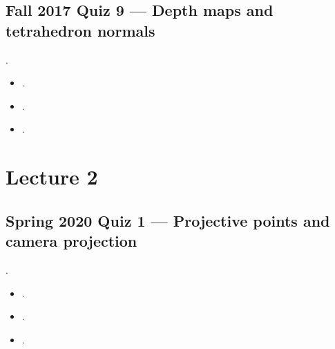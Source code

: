 \documentclass[letterpaper,11pt,english,openany,oneside]{jupyterBook}
\begin{document}
\subsection{Fall 2017 Quiz 9 — Depth maps and tetrahedron normals}
\label{\detokenize{reference/quiz-index:fall-2017-quiz-9-depth-maps-and-tetrahedron-normals}}
\sphinxAtStartPar
{} .
\begin{itemize}
\item {}
\sphinxAtStartPar
{\hyperref[\detokenize{lectures/lecture01/quiz-workbook:quiz-18-q1}]{}}.

\item {}
\sphinxAtStartPar
{\hyperref[\detokenize{lectures/lecture01/quiz-workbook:quiz-18-q2}]{}}.

\item {}
\sphinxAtStartPar
{\hyperref[\detokenize{lectures/lecture01/quiz-workbook:quiz-18-q3}]{}}.

\end{itemize}


\section{Lecture 2}
\label{\detokenize{reference/quiz-index:lecture-2}}
\sphinxAtStartPar
{}


\subsection{Spring 2020 Quiz 1 — Projective points and camera projection}
\label{\detokenize{reference/quiz-index:spring-2020-quiz-1-projective-points-and-camera-projection}}
\sphinxAtStartPar
{} .
\begin{itemize}
\item {}
\sphinxAtStartPar
{\hyperref[\detokenize{lectures/lecture02/quiz-workbook:quiz-8-q1}]{}}.

\item {}
\sphinxAtStartPar
{\hyperref[\detokenize{lectures/lecture02/quiz-workbook:quiz-8-q2}]{}}.

\item {}
\sphinxAtStartPar
{\hyperref[\detokenize{lectures/lecture02/quiz-workbook:quiz-8-q3}]{}}.

\end{itemize}
\end{document}
